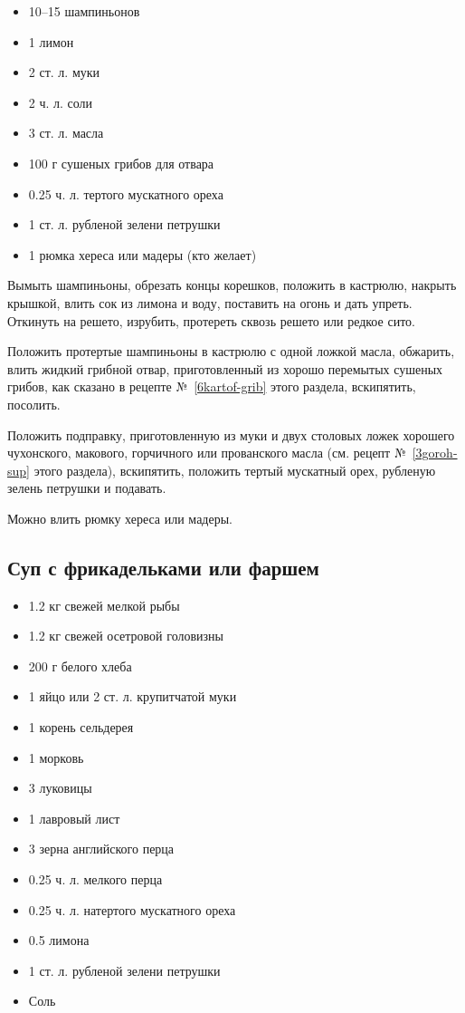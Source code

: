 \begin{itemize}
	\item 10–15 шампиньонов
    \item 1 лимон
    \item 2 ст. л. муки
    \item 2 ч. л. соли 
    \item 3 ст. л. масла
    \item 100 г сушеных грибов для отвара
    \item 0.25 ч. л. тертого мускатного ореха
    \item 1 ст. л. рубленой зелени петрушки
    \item 1 рюмка хереса или мадеры (кто желает)
\end{itemize}

Вымыть шампиньоны, обрезать концы корешков, положить в кастрюлю, накрыть крышкой, влить сок из лимона и воду, поставить на огонь и дать упреть. Откинуть на решето, изрубить, протереть сквозь решето или редкое сито.

Положить протертые шампиньоны в кастрюлю с одной ложкой масла, обжарить, влить жидкий грибной отвар, приготовленный из хорошо перемытых сушеных грибов, как сказано в рецепте №~\ref{6kartof-grib} этого раздела, вскипятить, посолить.

Положить подправку, приготовленную из муки и двух столовых ложек хорошего чухонского, макового, горчичного или прованского масла (см. рецепт №~\ref{3goroh-sup} этого раздела), вскипятить, положить тертый мускатный орех, рубленую зелень петрушки и подавать.

Можно влить рюмку хереса или мадеры.

\subsection{Суп с фрикадельками или фаршем}\label{20sup-frik-farsh}

\begin{itemize} 
	\item 1.2 кг свежей мелкой рыбы
    \item 1.2 кг свежей осетровой головизны 
    \item 200 г белого хлеба 
    \item 1 яйцо или 2 ст. л. крупитчатой муки 
    \item 1 корень сельдерея 
    \item 1 морковь 
    \item 3 луковицы 
    \item 1 лавровый лист 
    \item 3 зерна английского перца 
    \item 0.25 ч. л. мелкого перца 
    \item 0.25 ч. л. натертого мускатного ореха 
    \item 0.5 лимона 
    \item 1 ст. л. рубленой зелени петрушки 
    \item Соль
\end{itemize}

